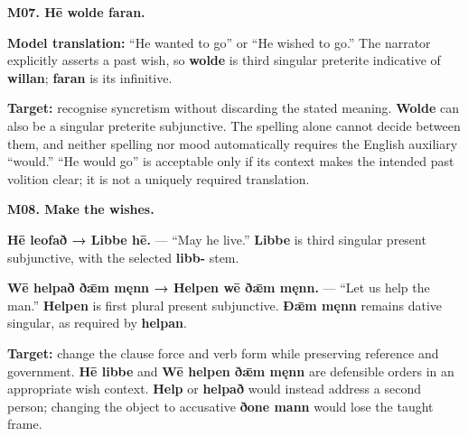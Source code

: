 \par\begin{minipage}{\linewidth}\raggedright
\textbf{M07. Hē wolde faran.}

\textbf{Model translation:} “He wanted to go” or “He wished to go.” The narrator explicitly asserts a past wish, so \textbf{wolde} is third singular preterite indicative of \textbf{willan}; \textbf{faran} is its infinitive.

\textbf{Target:} recognise syncretism without discarding the stated meaning. \textbf{Wolde} can also be a singular preterite subjunctive. The spelling alone cannot decide between them, and neither spelling nor mood automatically requires the English auxiliary “would.” “He would go” is acceptable only if its context makes the intended past volition clear; it is not a uniquely required translation.

\end{minipage}\par\addvspace{4pt}

\par\begin{minipage}{\linewidth}\raggedright
\textbf{M08. Make the wishes.}

\textbf{Hē leofað → Libbe hē.} — “May he live.” \textbf{Libbe} is third singular present subjunctive, with the selected \textbf{libb-} stem.

\textbf{Wē helpað ðǣm męnn → Helpen wē ðǣm męnn.} — “Let us help the man.” \textbf{Helpen} is first plural present subjunctive. \textbf{Ðǣm męnn} remains dative singular, as required by \textbf{helpan}.

\textbf{Target:} change the clause force and verb form while preserving reference and government. \textbf{Hē libbe} and \textbf{Wē helpen ðǣm męnn} are defensible orders in an appropriate wish context. \textbf{Help} or \textbf{helpað} would instead address a second person; changing the object to accusative \textbf{ðone mann} would lose the taught frame.

\end{minipage}\par\addvspace{4pt}

